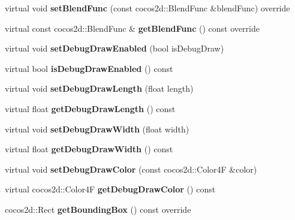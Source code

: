 \begin{DoxyCompactItemize}
\mbox{\label{classBoneNode_aa7959d4567721b643939e02f1215ab7b}} 
virtual void {\bfseries set\+Blend\+Func} (const cocos2d\+::\+Blend\+Func \&blend\+Func) override
\item 
\mbox{\label{classBoneNode_ac473ec193799b1dc545eaf2157b94089}} 
virtual const cocos2d\+::\+Blend\+Func \& {\bfseries get\+Blend\+Func} () const override
\item 
\mbox{\label{classBoneNode_a3fe85e3903480726b2198bd3065f45d0}} 
virtual void {\bfseries set\+Debug\+Draw\+Enabled} (bool is\+Debug\+Draw)
\item 
\mbox{\label{classBoneNode_a604f22582dbd1d52f218023522812025}} 
virtual bool {\bfseries is\+Debug\+Draw\+Enabled} () const
\item 
\mbox{\label{classBoneNode_a3ab1cc0ddda50d2b36f654c4ef77d62e}} 
virtual void {\bfseries set\+Debug\+Draw\+Length} (float length)
\item 
\mbox{\label{classBoneNode_a55015c7384cdf96dbedd4d8fe1d329a8}} 
virtual float {\bfseries get\+Debug\+Draw\+Length} () const
\item 
\mbox{\label{classBoneNode_a72932b9cab6dc6d82652a969a19dc9d9}} 
virtual void {\bfseries set\+Debug\+Draw\+Width} (float width)
\item 
\mbox{\label{classBoneNode_abf53e86c3cd79e8e8fa0276e939adfd5}} 
virtual float {\bfseries get\+Debug\+Draw\+Width} () const
\item 
\mbox{\label{classBoneNode_a451cd75039951bb8c36339452c0b33f3}} 
virtual void {\bfseries set\+Debug\+Draw\+Color} (const cocos2d\+::\+Color4F \&color)
\item 
\mbox{\label{classBoneNode_a413a53b0540e9f74f83a4dfac2ebfb00}} 
virtual cocos2d\+::\+Color4F {\bfseries get\+Debug\+Draw\+Color} () const
\item 
\mbox{\label{classBoneNode_ad928c8e12a7c7cdbb965498d50d1d3ca}} 
cocos2d\+::\+Rect {\bfseries get\+Bounding\+Box} () const override

\end{DoxyCompactItemize}
